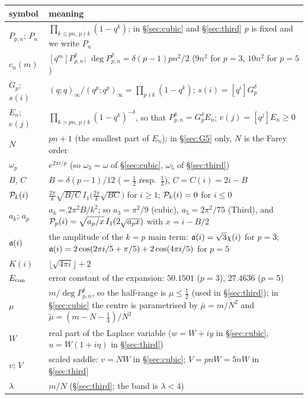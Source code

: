\begin{table}[h]
\centering
\small
\renewcommand{\arraystretch}{1.15}
\begin{tabular}{@{}p{}p{}@{}}
\toprule
symbol & meaning\\
\midrule
$P_{p,n}$; $P_n$ & $\prod_{k\le pn,\,p\nmid k}(1-q^k)$; in \S\ref{sec:cubic} and \S\ref{sec:third} $p$ is fixed and we write $P_n$\\
$c_n(m)$ & $[q^m]P_{p,n}^\delta$; $\deg P_{p,n}^\delta=\delta(p-1)pn^2/2$ ($9n^2$ for $p=3$, $10n^2$ for $p=5$)\\
$G_p$; $s(i)$ & $(q;q)_\infty/(q^p;q^p)_\infty=\prod_{p\nmid k}(1-q^k)$; $s(i)=[q^i]G_p^\delta$\\
$E_n$; $e(j)$ & $\prod_{k>pn,\,p\nmid k}(1-q^k)^{-\delta}$, so that $P_{p,n}^\delta=G_p^\delta E_n$; $e(j)=[q^j]E_n\ge0$\\
$N$ & $pn+1$ (the smallest part of $E_n$); in \S\ref{sec:G5} only, $N$ is the Farey order\\
$\omega_p$ & $e^{2\pi i/p}$ (so $\omega_3=\omega$ of \S\ref{sec:cubic}, $\omega_5$ of \S\ref{sec:third})\\
$B$, $C$ & $B=\delta(p-1)/12$ ($=\frac12$ resp.\ $\frac13$), $C=C(i)=2i-B$\\
$\mathcal P_k(i)$ & $\frac{2\pi}{k}\sqrt{B/C}\,I_1\big(\frac{2\pi}{k}\sqrt{BC}\big)$ for $i\ge1$; $\mathcal P_k(i)=0$ for $i\le0$\\
$a_k$; $a_p$ & $a_k=2\pi^2B/k^2$; so $a_3=\pi^2/9$ (cubic), $a_5=2\pi^2/75$ (Third), and
$\mathcal P_p(i)=\sqrt{a_p/x}\,I_1(2\sqrt{a_px})$ with $x=i-B/2$\\
$\mathfrak a(i)$ & the amplitude of the $k=p$ main term: $\mathfrak a(i)=\sqrt3\chi(i)$ for $p=3$; $\mathfrak a(i)=2\cos(2\pi i/5+\pi/5)+2\cos(4\pi i/5)$ for $p=5$\\
$K(i)$ & $\lfloor\sqrt{4\pi i}\rfloor+2$\\
$E_{\mathrm{con}}$ & error constant of the expansion: $50.1501$ ($p=3$), $27.4636$ ($p=5$)\\
$\mu$ & $m/\deg P_{p,n}^\delta$, so the half-range is $\mu\le\frac12$ (used in \S\ref{sec:third});
in \S\ref{sec:cubic} the centre is parametrised by $\bar\mu=m/N^2$ and $\tilde\mu=(m-N-\frac14)/N^2$\\
$W$ & real part of the Laplace variable ($w=W+iy$ in \S\ref{sec:cubic}, $u=W(1+i\eta)$ in \S\ref{sec:third})\\
$v$; $V$ & scaled saddle: $v=NW$ in \S\ref{sec:cubic}; $V=pnW=5nW$ in \S\ref{sec:third}\\
$\lambda$ & $m/N$ (\S\ref{sec:third}; the band is $\lambda<4$)\\

\end{tabular}
\end{table}
